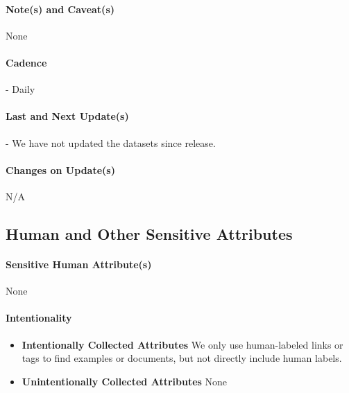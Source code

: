 \paragraph{Note(s) and Caveat(s)}
None

\paragraph{Cadence}
- Daily

\paragraph{Last and Next Update(s)}
- We have not updated the datasets since release.

\paragraph{Changes on Update(s)}
N/A

\subsection{Human and Other Sensitive Attributes}

\paragraph{Sensitive Human Attribute(s)}
None

\paragraph{Intentionality}
\begin{itemize}
\item \textbf{Intentionally Collected Attributes}
We only use human-labeled links or tags to find examples or documents, but not directly include human labels.

\item \textbf{Unintentionally Collected Attributes}
None

\end{itemize}

